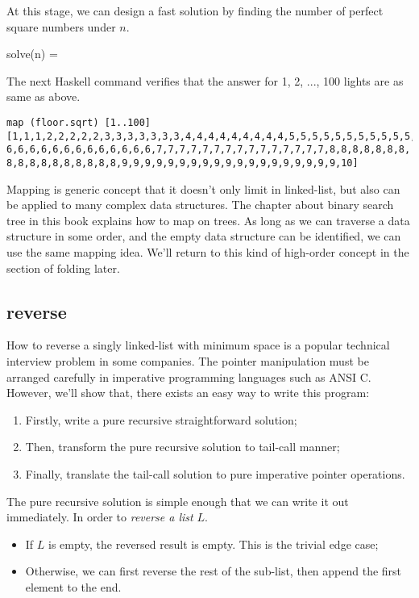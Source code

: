 \documentclass[b5paper]{article}
\begin{document}
At this stage, we can design a fast solution by finding the number of perfect square numbers under $n$.

\be
solve(n) = \lfloor {} \rfloor
\ee

The next Haskell command verifies that the answer for 1, 2, ..., 100 lights are as same as above.

\begin{lstlisting}
map (floor.sqrt) [1..100]
[1,1,1,2,2,2,2,2,3,3,3,3,3,3,3,4,4,4,4,4,4,4,4,4,5,5,5,5,5,5,5,5,5,5,5,
6,6,6,6,6,6,6,6,6,6,6,6,6,7,7,7,7,7,7,7,7,7,7,7,7,7,7,7,8,8,8,8,8,8,8,
8,8,8,8,8,8,8,8,8,8,9,9,9,9,9,9,9,9,9,9,9,9,9,9,9,9,9,9,9,10]
\end{lstlisting}

Mapping is generic concept that it doesn't only limit in linked-list, but also can be applied to many
complex data structures. The chapter about binary search tree in this book explains how to map on trees.
As long as we can traverse a data structure in some order, and the empty data structure can be identified,
we can use the same mapping idea. We'll return to this kind of high-order concept in the section of folding
later.

\subsection{reverse}
 \label{sec:reverse}
How to reverse a singly linked-list with minimum space is a popular technical interview problem in some companies.
The pointer manipulation must be arranged carefully in imperative programming languages such as ANSI C.
However, we'll show that, there exists an easy way to write this program:

\begin{enumerate}
\item Firstly, write a pure recursive straightforward solution;
\item Then, transform the pure recursive solution to tail-call manner;
\item Finally, translate the tail-call solution to pure imperative pointer operations.
\end{enumerate}

The pure recursive solution is simple enough that we can write it out immediately. In order to {\em reverse a list} $L$.

\begin{itemize}
\item If $L$ is empty, the reversed result is empty. This is the trivial edge case;
\item Otherwise, we can first reverse the rest of the sub-list, then append the first element to the end.
\end{itemize}
\end{document}
